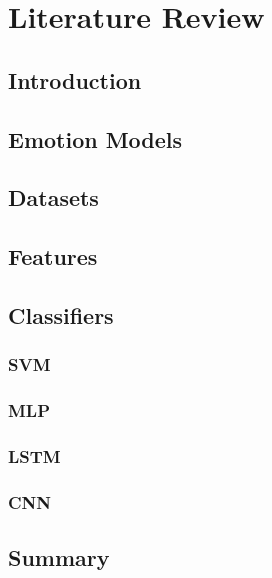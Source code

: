 \chapter{Literature Review}

\section{Introduction}

\section{Emotion Models}
\section{Datasets}
\section{Features}
\section{Classifiers}
\subsection{SVM}
\subsection{MLP}
\subsection{LSTM}
\subsection{CNN}
\section{Summary}
